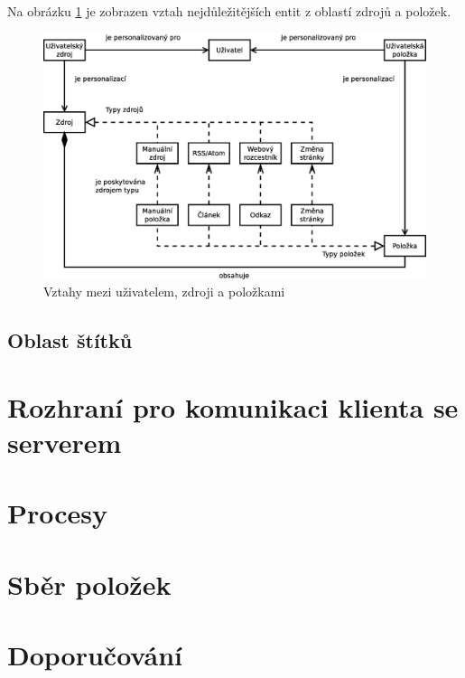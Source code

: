 \bigskip{}

Na obrázku \ref{fig:source-item} je zobrazen vztah nejdůležitějších entit z oblastí zdrojů a položek.

\begin{figure}
    \centering
    \includegraphics[width=12cm]{img/zdroje-polozky.eps}
    \caption{Vztahy mezi uživatelem, zdroji a položkami}
    \label{fig:source-item}
\end{figure}

\subsection{Oblast štítků}

\section{Rozhraní pro komunikaci klienta se serverem}

\section{Procesy}

\section{Sběr položek}

\section{Doporučování}
